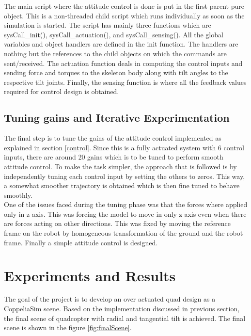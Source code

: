 \documentclass[a4paper, 12pt, oneside]{book}
\begin{document}
The main script where the attitude control is done is put in the first parent pure object. This is a non-threaded child script which runs individually as soon as the simulation is started. The script has mainly three functions which are sysCall\_init(), sysCall\_actuation(), and sysCall\_sensing(). All the global variables and object handlers are defined in the init function. The handlers are nothing but the references to the child objects on which the commands are sent/received. The actuation function deals in computing the control inputs and sending force and torques to the skeleton body along with tilt angles to the respective tilt joints. Finally, the sensing function is where all the feedback values required for control design is obtained.   

\section{Tuning gains and Iterative Experimentation}\label{tune}
The final step is to tune the gains of the attitude control implemented as explained in section \ref{control}. Since this is a fully actuated system with 6 control inputs, there are around 20 gains which is to be tuned to perform smooth attitude control. To make the task simpler, the approach that is followed is by independently tuning each control input by setting the others to zeros. This way, a somewhat smoother trajectory is obtained which is then fine tuned to behave smoothly.\\

One of the issues faced during the tuning phase was that the forces where applied only in z axis. This was forcing the model to move in only z axis even when there are forces acting on other directions. This was fixed by moving the reference frame on the robot by homogeneous transformation of the ground and the robot frame. Finally a simple attitude control is designed.   

\chapter{Experiments and Results}\label{expe}
The goal of the project is to develop an over actuated quad design as a CoppeliaSim scene. Based on the implementation discussed in previous section, the final scene of quadcopter with radial and tangential tilt is achieved. The final scene is shown in the figure \ref{fig:finalScene}.
\end{document}
